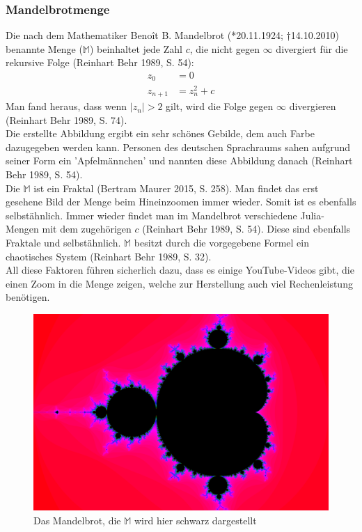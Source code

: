 \subsubsection{Mandelbrotmenge}
Die nach dem Mathematiker Benoît B. Mandelbrot (*20.11.1924; †14.10.2010) benannte Menge ($\mathbb{M}$) beinhaltet jede Zahl $c$, die nicht gegen $\infty$ divergiert für die rekursive Folge (Reinhart Behr 1989, S. 54):
\begin{align*}
z_0&=0\\
z_{n+1}&=z^2_n+c
\end{align*}
Man fand heraus, dass wenn $|z_n| > 2$ gilt, wird die Folge gegen $\infty$ divergieren (Reinhart Behr 1989, S. 74).\\
Die erstellte Abbildung ergibt ein sehr schönes Gebilde, dem auch Farbe dazugegeben werden kann. Personen des deutschen Sprachraums sahen aufgrund seiner Form ein ’Apfelmännchen’ und nannten diese Abbildung danach (Reinhart Behr 1989, S. 54).\\
Die $\mathbb{M}$ ist ein Fraktal (Bertram Maurer 2015, S. 258). Man findet das erst gesehene Bild der Menge beim Hineinzoomen immer wieder. Somit ist es ebenfalls selbstähnlich. Immer wieder findet man im Mandelbrot verschiedene Julia-Mengen mit dem zugehörigen $c$ (Reinhart Behr 1989, S. 54). Diese sind ebenfalls Fraktale und selbstähnlich. $\mathbb{M}$ besitzt durch die vorgegebene Formel ein chaotisches System (Reinhart Behr 1989, S. 32).\\
All diese Faktoren führen sicherlich dazu, dass es einige YouTube-Videos gibt, die einen Zoom in die Menge zeigen, welche zur Herstellung auch viel Rechenleistung benötigen.
\begin{figure}[h]
	\centering
	\includegraphics[width=.5\textwidth]{Pictures/Mandelbrot2668x4002.png}
	\caption{Das Mandelbrot, die $\mathbb{M}$ wird hier schwarz dargestellt}
	\label{fig:Mandelbrot}
\end{figure}
\newpage
